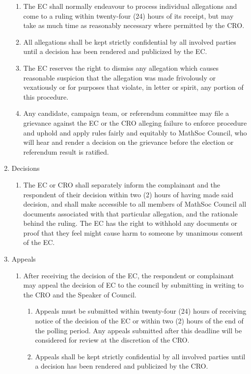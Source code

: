 \begin{enumerate}
\begin{enumerate}
			\item The EC shall normally endeavour to process individual allegations and come to a ruling within twenty-four (24) hours of its receipt, but may take as much time as reasonably necessary where permitted by the CRO.
			\item All allegations shall be kept strictly confidential by all involved parties until a decision has been rendered and publicized by the EC.
			\item The EC reserves the right to dismiss any allegation which causes reasonable suspicion that the allegation was made frivolously or vexatiously or for purposes that violate, in letter or spirit, any portion of this procedure.
			\item Any candidate, campaign team, or referendum committee may file a grievance against the EC or the CRO alleging failure to enforce procedure and uphold and apply rules fairly and equitably to MathSoc Council, who will hear and render a decision on the grievance before the election or referendum result is ratified.
		\end{enumerate}
	\item Decisions 
		\begin{enumerate}
			\item The EC or CRO shall separately inform the complainant and the respondent of their decision within two (2) hours of having made said decision, and shall make accessible to all members of MathSoc Council all documents associated with that particular allegation, and the rationale behind the ruling. The EC has the right to withhold any documents or proof that they feel might cause harm to someone by unanimous consent of the EC.
		\end{enumerate}
	\item Appeals 
		\begin{enumerate}
			\item After receiving the decision of the EC, the respondent or complainant may appeal the decision of EC to the council by submitting in writing to the CRO and the Speaker of Council.
				\begin{enumerate}
					\item Appeals must be submitted within twenty-four (24) hours of receiving notice of the decision of the EC or within two (2) hours of the end of the polling period. Any appeals submitted after this deadline will be considered for review at the discretion of the CRO.
					\item Appeals shall be kept strictly confidential by all involved parties until a decision has been rendered and publicized by the CRO.

\end{enumerate}
\end{enumerate}
\end{enumerate}
